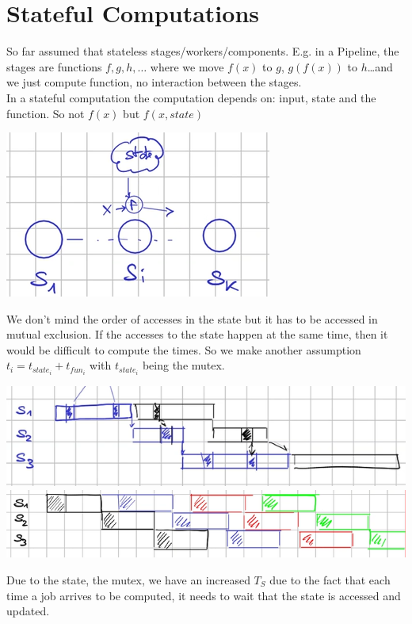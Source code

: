 \documentclass[10pt]{report}
\begin{document}
\section{Stateful Computations} So far assumed that stateless stages/workers/components. E.g. in a Pipeline, the stages are functions $f,g,h,\ldots$ where we move $f(x)$ to $g$, $g(f(x))$ to $h$\ldots and we just compute function, no interaction between the stages.\\
In a stateful computation the computation depends on: input, state and the function. So not $f(x)$ but $f(x, state)$
\begin{center}
	\includegraphics[scale=0.5]{18.png}
\end{center}
We don't mind the order of accesses in the state but it has to be accessed in mutual exclusion. If the accesses to the state happen at the same time, then it would be difficult to compute the times. So we make another assumption $t_i = t_{state_i} + t_{fun_i}$ with $t_{state_i}$ being the mutex.
\begin{center}
	\includegraphics[scale=0.5]{19.png}\\
	\includegraphics[scale=0.5]{20.png}
\end{center}
Due to the state, the mutex, we have an increased $T_S$ due to the fact that each time a job arrives to be computed, it needs to wait that the state is accessed and updated.\\
\end{document}
